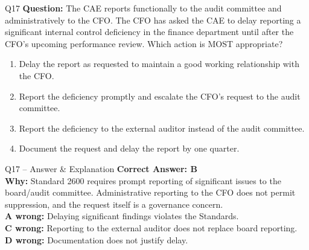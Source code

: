 \documentclass[aspectratio=169,10pt]{beamer}
\begin{document}
	\begin{frame}[t]{Q17}
		\small
		\textbf{Question:} The CAE reports functionally to the audit committee and administratively to the CFO. The CFO has asked the CAE to delay reporting a significant internal control deficiency in the finance department until after the CFO's upcoming performance review. Which action is MOST appropriate?
		\begin{enumerate}[label=\Alph*.,itemsep=1pt,topsep=2pt]
			\item Delay the report as requested to maintain a good working relationship with the CFO.
			\item Report the deficiency promptly and escalate the CFO's request to the audit committee.
			\item Report the deficiency to the external auditor instead of the audit committee.
			\item Document the request and delay the report by one quarter.
		\end{enumerate}
	\end{frame}
	
	\begin{frame}[t]{Q17 -- Answer \& Explanation}
		\small
		\textbf{Correct Answer: B} \\[4pt]
		\textbf{Why:} Standard 2600 requires prompt reporting of significant issues to the board/audit committee. Administrative reporting to the CFO does not permit suppression, and the request itself is a governance concern. \\[4pt]
		\textbf{A wrong:} Delaying significant findings violates the Standards. \\[2pt]
		\textbf{C wrong:} Reporting to the external auditor does not replace board reporting. \\[2pt]
		\textbf{D wrong:} Documentation does not justify delay.
	\end{frame}
	
\end{document}
